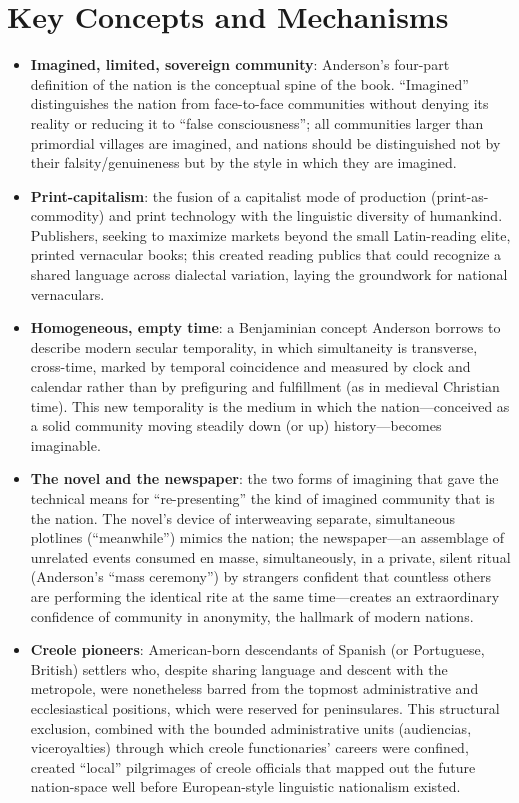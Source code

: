\documentclass[12pt]{article}
\begin{document}
\section{Key Concepts and Mechanisms}

\begin{itemize}[leftmargin=*, itemsep=4pt]
    \item \textbf{Imagined, limited, sovereign community}: Anderson's four-part definition of the nation is the conceptual spine of the book. ``Imagined'' distinguishes the nation from face-to-face communities without denying its reality or reducing it to ``false consciousness''; all communities larger than primordial villages are imagined, and nations should be distinguished not by their falsity/genuineness but by the style in which they are imagined.
    \item \textbf{Print-capitalism}: the fusion of a capitalist mode of production (print-as-commodity) and print technology with the linguistic diversity of humankind. Publishers, seeking to maximize markets beyond the small Latin-reading elite, printed vernacular books; this created reading publics that could recognize a shared language across dialectal variation, laying the groundwork for national vernaculars.
    \item \textbf{Homogeneous, empty time}: a Benjaminian concept Anderson borrows to describe modern secular temporality, in which simultaneity is transverse, cross-time, marked by temporal coincidence and measured by clock and calendar rather than by prefiguring and fulfillment (as in medieval Christian time). This new temporality is the medium in which the nation---conceived as a solid community moving steadily down (or up) history---becomes imaginable.
    \item \textbf{The novel and the newspaper}: the two forms of imagining that gave the technical means for ``re-presenting'' the kind of imagined community that is the nation. The novel's device of interweaving separate, simultaneous plotlines (``meanwhile'') mimics the nation; the newspaper---an assemblage of unrelated events consumed en masse, simultaneously, in a private, silent ritual (Anderson's ``mass ceremony'') by strangers confident that countless others are performing the identical rite at the same time---creates an extraordinary confidence of community in anonymity, the hallmark of modern nations.
    \item \textbf{Creole pioneers}: American-born descendants of Spanish (or Portuguese, British) settlers who, despite sharing language and descent with the metropole, were nonetheless barred from the topmost administrative and ecclesiastical positions, which were reserved for peninsulares. This structural exclusion, combined with the bounded administrative units (audiencias, viceroyalties) through which creole functionaries' careers were confined, created ``local'' pilgrimages of creole officials that mapped out the future nation-space well before European-style linguistic nationalism existed.

\end{itemize}
\end{document}
